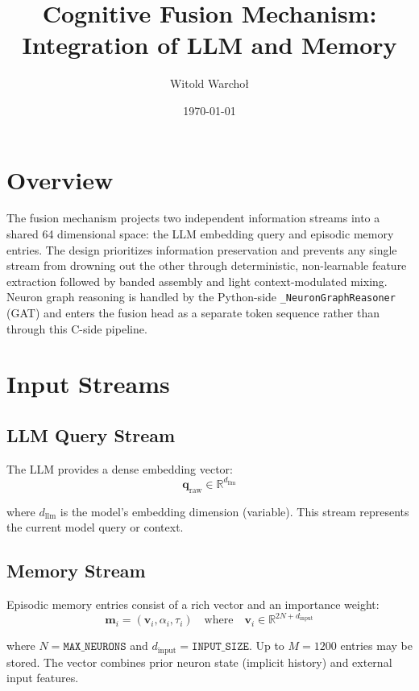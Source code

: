 \documentclass[12pt]{article}
\title{Cognitive Fusion Mechanism: Integration of LLM and Memory}
\author{Witold Warcho\l{}}
\date{\today}
\begin{document}
\maketitle

\section{Overview}

The fusion mechanism projects two independent information streams
into a shared 64 dimensional space: the LLM embedding query and episodic
memory entries. The design prioritizes information preservation and prevents
any single stream from drowning out the other through deterministic,
non-learnable feature extraction followed by banded assembly and light
context-modulated mixing. Neuron graph reasoning is handled by the
Python-side \texttt{\_NeuronGraphReasoner} (GAT) and enters the fusion
head as a separate token sequence rather than through this C-side pipeline.

\section{Input Streams}

\subsection{LLM Query Stream}

The LLM provides a dense embedding vector:
\begin{equation}
\mathbf{q}_{\text{raw}} \in \mathbb{R}^{d_{\text{llm}}}
\end{equation}

where $d_{\text{llm}}$ is the model's embedding dimension (variable).
This stream represents the current model query or context.

\subsection{Memory Stream}

Episodic memory entries consist of a rich vector and an importance weight:
\begin{equation}
\mathbf{m}_i = (\mathbf{v}_i, \alpha_i, \tau_i)
\quad \text{where} \quad
\mathbf{v}_i \in \mathbb{R}^{2N + d_{\text{input}}}
\end{equation}

where $N = \texttt{MAX\_NEURONS}$ and $d_{\text{input}} = \texttt{INPUT\_SIZE}$.
Up to $M = 1200$ entries may be stored. The vector combines prior neuron
state (implicit history) and external input features.
\end{document}

